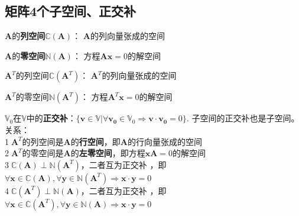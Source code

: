 \documentclass{article}
\begin{document}
\begin{CJK}{UTF8}{gbsn}
\section{矩阵4个子空间、正交补}
	$\boldsymbol{A}$的\textbf{列空间}$\mathbb{C}(\boldsymbol{A})$：
	$\boldsymbol{A}$的列向量张成的空间\par
	$\boldsymbol{A}$的\textbf{零空间}$\mathbb{N}(\boldsymbol{A})$：
	方程$\boldsymbol{Ax}=0$的解空间\par
	$\boldsymbol{A}^T$的列空间$\mathbb{C}(\boldsymbol{A}^T)$：
	$\boldsymbol{A}^T$的列向量张成的空间\par
	$\boldsymbol{A}^T$的零空间$\mathbb{N}(\boldsymbol{A}^T)$：
	方程$\boldsymbol{A}^T\boldsymbol{x}=0$的解空间\par
	$\mathbb{V}_0$在$\mathbb{V}$中的\textbf{正交补}：$\{\boldsymbol{v}\in\mathbb{V}|\forall\boldsymbol{v_0}\in\mathbb{V}_0\Rightarrow\boldsymbol{v}\cdot\boldsymbol{v_0}=0\}$.
	子空间的正交补也是子空间。\\
	关系：\\
	\textcircled{1}$\boldsymbol{A}^T$的列空间是$\boldsymbol{A}$的\textbf{行空间}，即$\boldsymbol{A}$的行向量张成的空间\\
	\textcircled{2}$\boldsymbol{A}^T$的零空间是$\boldsymbol{A}$的\textbf{左零空间}，即方程$\boldsymbol{xA}=0$的解空间\\
	\textcircled{3}$\mathbb{C}(\boldsymbol{A}) \perp \mathbb{N}(\boldsymbol{A}^T)$，二者互为正交补
	，即$\forall\boldsymbol{x}\in\mathbb{C}(\boldsymbol{A}),\forall\boldsymbol{y}\in\mathbb{N}(\boldsymbol{A}^T)\Rightarrow\boldsymbol{x}\cdot\boldsymbol{y}=0$\\
	\textcircled{4}$\mathbb{C}(\boldsymbol{A}^T) \perp \mathbb{N}(\boldsymbol{A})$，二者互为正交补
	，即$\forall\boldsymbol{x}\in\mathbb{C}(\boldsymbol{A}^T),\forall\boldsymbol{y}\in\mathbb{N}(\boldsymbol{A})\Rightarrow\boldsymbol{x}\cdot\boldsymbol{y}=0$\\

		

\end{CJK}
\end{document}
